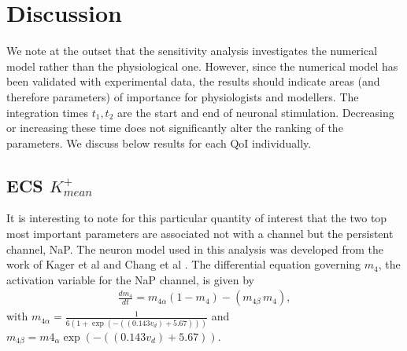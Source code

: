 \section{Discussion}
We  note at the outset that the sensitivity analysis investigates the numerical model rather than the physiological one. However, since the numerical model has been validated with experimental data,  the results should indicate areas (and therefore parameters) of importance for physiologists and modellers. The integration times $t_1,t_2$ are the start and end of neuronal stimulation. Decreasing or increasing these time does not significantly alter the ranking of the parameters. We discuss below results for each QoI individually. 


\subsection{ECS $K^+_{mean}$}
It is interesting to note for this particular quantity of interest that the two top most important parameters are associated not with a \pot channel but the persistent \na channel, NaP.  The neuron model used in this analysis was developed from the work of Kager et al \cite{Kager2000a} and Chang et al \cite{Chang2013}.
The differential equation governing $m_4$,  the activation variable for the NaP channel, is given by 
\begin{eqnarray}
\frac{d m_4}{dt} = m_{4 \alpha}(1 - m_4) - (m_{4\beta} \, m_4), \label{eqn:m4alpha}
\end{eqnarray}
with $\displaystyle m_{4 \alpha}= \frac{1}{6(1 + \exp(-((0.143 v_d) + 5.67)))}$ and $m_{4 \beta} = m4_{\alpha} \exp(-((0.143 v_d) + 5.67))$. 

